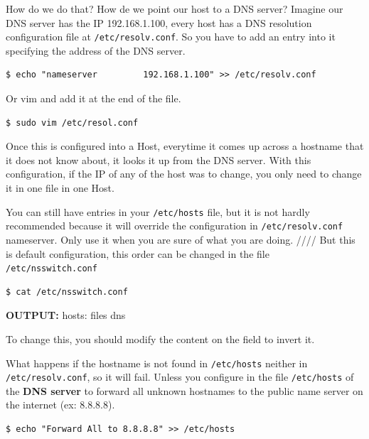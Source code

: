 \documentclass{article}
\newenvironment{blocktemplateIII}[1]{%
    \tcolorbox[beamer,%
    noparskip,breakable,
    ,colframe=Red,%
    colbacklower=LimeGreen!75!LightGreen,%
    title=#1]}%
    {\endtcolorbox}
\newenvironment{codetemplate}[1][]{%
  \mybasecolorbox[#1]
  \itshape
}{%
  \endmybasecolorbox
}
\begin{document}
How do we do that? How de we point our host to a DNS server? Imagine our DNS server has the IP 192.168.1.100, every host has a DNS resolution configuration file at \verb|/etc/resolv.conf|. So you have to add an entry into it specifying the address of the DNS server.

\begin{codetemplate}{}
\begin{verbatim}
$ echo "nameserver         192.168.1.100" >> /etc/resolv.conf
\end{verbatim}
\end{codetemplate}

Or vim and add it at the end of the file.
\begin{codetemplate}{}
\begin{verbatim}
$ sudo vim /etc/resol.conf
\end{verbatim}
\end{codetemplate}

Once this is configured into a Host, everytime it comes up across a hostname that it does not know about, it looks it up from the DNS server. With this configuration, if the IP of any of the host was to change, you only need to change it in one file in one Host.

\begin{blocktemplateIII}{WARNING}
You can still have entries in your \verb|/etc/hosts| file, but it is not hardly recommended because it will override the configuration in \verb|/etc/resolv.conf| nameserver. Only use it when you are sure of what you are doing.
////
But this is default configuration, this order can be changed in the file \verb|/etc/nsswitch.conf|
\begin{codetemplate}{}
\begin{verbatim}
$ cat /etc/nsswitch.conf
\end{verbatim}
\end{codetemplate}

\textbf{OUTPUT:} hosts:    files dns

To change this, you should modify the content on the field to invert it.
\end{blocktemplateIII}

What happens if the hostname is not found in \verb|/etc/hosts| neither in \verb|/etc/resolv.conf|, so it will fail. Unless you configure in the file \verb|/etc/hosts| of the \textbf{DNS server} to forward all unknown hostnames to the public name server on the internet (ex: 8.8.8.8).

\begin{codetemplate}{}
\begin{verbatim}
$ echo "Forward All to 8.8.8.8" >> /etc/hosts
\end{verbatim}
\end{codetemplate}
\end{document}
